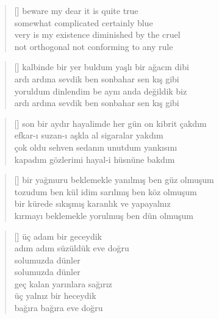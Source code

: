 \documentclass[a5paper, openright, twoside]{memoir}
\begin{document}
\begin{verse}[\versewidth]
  beware my dear it is quite true \\
  somewhat complicated certainly blue \\
  very is my existence diminished by the cruel \\
  not orthogonal not conforming to any rule \\
\end{verse}
\begin{verse}[\versewidth]
  kalbinde bir yer buldum yaşlı bir ağacın dibi \\
  ardı ardına sevdik ben sonbahar sen kış gibi \\
  yoruldum dinlendim be aynı anda değildik biz \\
  ardı ardına sevdik ben sonbahar sen kış gibi \\
\end{verse}
\begin{verse}[\versewidth]
  son bir aydır hayalimde her gün on kibrit çakdım \\
  efkar-ı suzan-ı aşkla al sigaralar yakdım \\
  çok oldu sehven sedanın unutdum yankısını \\
  kapadım gözlerimi hayal-i hüsnüne bakdım \\
\end{verse}
\begin{verse}[\versewidth]
  bir yağmuru beklemekle yanılmış ben güz olmuşum \\
  tozudum ben kül idim sarılmış ben köz olmuşum \\
  bir kürede sıkışmış karanlık ve yapayalnız \\
  kırmayı beklemekle yorulmuş ben dün olmuşum \\
\end{verse}
\begin{verse}[\versewidth]
  üç adam bir geceydik \\
  adım adım süzüldük eve doğru \\
  solumuzda dünler \\
  solumuzda dünler \\
  geç kalan yarınlara sağırız \\
  üç yalnız bir heceydik \\
  bağıra bağıra eve doğru \\
\end{verse}
\end{document}
